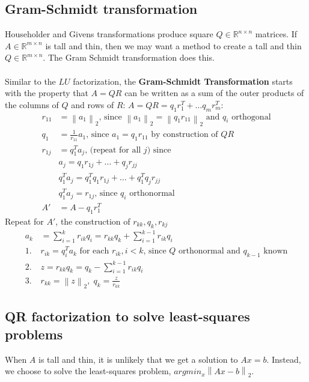 \documentclass{article}
\newcommand{\norm}[2]{\left\lVert#1\right\rVert_#2}
\begin{document}
\subsection{Gram-Schmidt transformation}
Householder and Givens transformations produce square $Q \in \mathbb{R}^{n\times n}$ matrices. If $A \in \mathbb{R}^{m\times n}$ is tall and thin, then we may want a method to create a tall and thin $Q \in \mathbb{R}^{m\times n}$. The Gram Schmidt transformation does this.\\ \\
Similar to the $LU$ factorization, the \textbf{Gram-Schmidt Transformation} starts with the property that $A=QR$ can be written as a sum of the outer products of the columns of $Q$ and rows of $R$: $A = QR = q_1r_1^T + \dots q_mr_m^T$:
\begin{align*}
    r_{11} &= \norm{a_1}{2} \textrm{, since } \norm{a_1}{2} = \norm{q_1r_{11}}{2} \textrm{ and $q_i$ orthogonal}\\
    q_1 &= \frac{1}{r_{11}}a_1\textrm{, since } a_1 = q_1r_{11} \textrm{ by construction of } QR \\
    r_{1j} &= q_1^Ta_j \textrm{, (repeat for all $j$) since }\\
    & a_j = q_1r_{1j} + \dots + q_jr_{jj}\\
    & q_1^Ta_j = q_1^Tq_1r_{1j} + \dots + q_1^Tq_jr_{jj}\\
    & q_1^Ta_j = r_{1j} \textrm{, since $q_i$ orthonormal}\\
    A' &= A - q_1r_1^T
\end{align*}
Repeat for $A'$, the construction of $r_{kk}, q_k, r_{kj}$
\begin{align*}
    a_k &= \sum_{i=1}^kr_{ik}q_i = r_{kk}q_k + \sum_{i=1}^{k-1}r_{ik}q_i\\
    1. \; &r_{ik} = q_i^Ta_k \textrm{ for each $r_{ik}, i < k$, since $Q$ orthonormal and $q_{k-1}$ known}\\
    2. \; &z = r_{kk}q_k = q_k - \sum_{i=1}^{k-1}r_{ik}q_i\\
    3. \; & r_{kk} = \norm{z}{2}, \; q_k = \frac{z}{r_{kk}}
\end{align*}


\subsection{QR factorization to solve least-squares problems}
When $A$ is tall and thin, it is unlikely that we get a solution to $Ax = b$. Instead, we choose to solve the least-squares problem, $argmin_x\norm{Ax - b}{2}$. 
\end{document}
